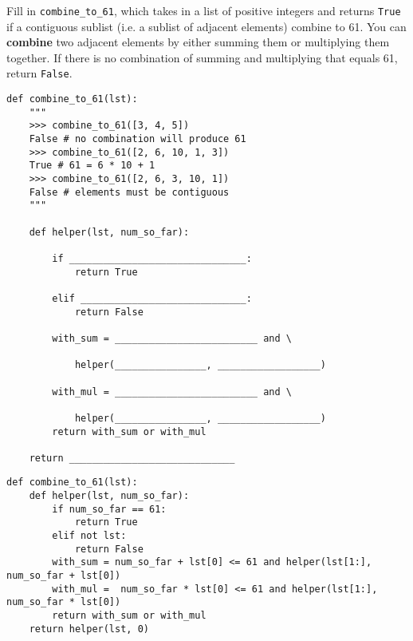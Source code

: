 \begin{blocksection}
\question
Fill in \lstinline{combine_to_61}, which takes in a list of positive integers and returns \lstinline{True} if a contiguous sublist (i.e. a sublist of adjacent elements) combine to 61. You can \textbf{combine} two adjacent elements by either summing them or multiplying them together. If there is no combination of summing and multiplying that equals 61, return \lstinline{False}.

\begin{lstlisting}
def combine_to_61(lst):
    """
    >>> combine_to_61([3, 4, 5])
    False # no combination will produce 61
    >>> combine_to_61([2, 6, 10, 1, 3])
    True # 61 = 6 * 10 + 1
    >>> combine_to_61([2, 6, 3, 10, 1])
    False # elements must be contiguous
    """

    def helper(lst, num_so_far):

        if _______________________________:
            return True

        elif _____________________________:
            return False

        with_sum = _________________________ and \

            helper(________________, __________________)

        with_mul = _________________________ and \

            helper(________________, __________________)
        return with_sum or with_mul

    return _____________________________
\end{lstlisting}
\end{blocksection}

\begin{blocksection}
\begin{solution}
\begin{lstlisting}
def combine_to_61(lst): 
    def helper(lst, num_so_far): 	
        if num_so_far == 61: 
            return True 
        elif not lst: 
            return False 
        with_sum = num_so_far + lst[0] <= 61 and helper(lst[1:], num_so_far + lst[0]) 
        with_mul =  num_so_far * lst[0] <= 61 and helper(lst[1:], num_so_far * lst[0]) 
        return with_sum or with_mul 
    return helper(lst, 0)
\end{lstlisting}
\end{solution}
\end{blocksection}